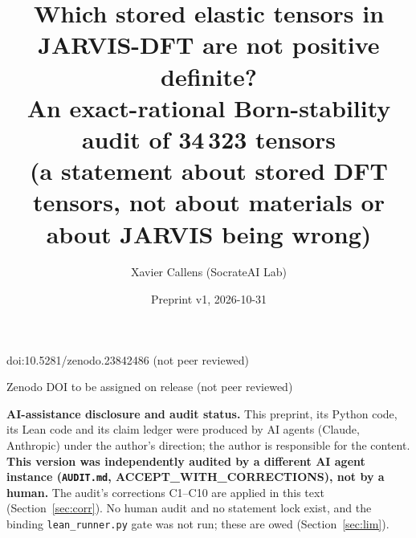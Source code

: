 \documentclass[10pt]{article}
\title{Which stored elastic tensors in JARVIS-DFT are not positive definite?\\
An exact-rational Born-stability audit of 34\,323 tensors\\
{\large (a statement about stored DFT tensors, not about materials or about JARVIS being wrong)}}
\author{Xavier Callens (SocrateAI Lab)}
\date{Preprint v1, 2026-10-31}
\begin{document}
\maketitle
\begin{center}\small doi:10.5281/zenodo.23842486 \quad (not peer reviewed)\end{center}

\begin{center}\small Zenodo DOI to be assigned on release \quad (not peer reviewed)\end{center}

\noindent\textbf{AI-assistance disclosure and audit status.} This preprint, its Python code, its Lean code and its claim ledger were
produced by AI agents (Claude, Anthropic) under the author's direction; the author is responsible for the content.
\textbf{This version was independently audited by a different AI agent instance (\texttt{AUDIT.md}, ACCEPT\_WITH\_CORRECTIONS), not by a human.}
The audit's corrections C1--C10 are applied in this text (Section~\ref{sec:corr}). No human audit and no statement lock exist, and the binding \texttt{lean\_runner.py} gate was not run; these are owed (Section~\ref{sec:lim}).
\end{document}
